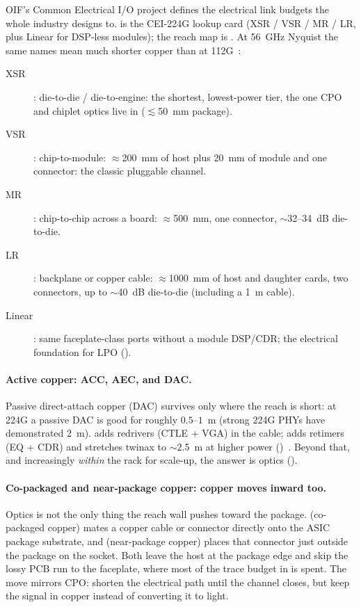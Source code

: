  OIF's Common Electrical I/O
project defines the electrical link budgets the whole industry designs to.
 is the CEI-224G lookup card (XSR / VSR / MR / LR, plus
Linear for DSP-less modules); the reach map is . At
56~GHz Nyquist the same names mean much shorter copper than at 112G~\cite{cei224}:
\begin{description}
\item[XSR] : die-to-die / die-to-engine: the shortest, lowest-power tier, the one CPO
      and chiplet optics live in ($\lesssim$50~mm package).
\item[VSR] : chip-to-module: $\approx$200~mm of host plus 20~mm of module and one
      connector: the classic pluggable channel.
\item[MR] : chip-to-chip across a board: $\approx$500~mm, one connector,
      $\sim$32--34~dB die-to-die.
\item[LR] : backplane or copper cable: $\approx$1000~mm of host and daughter cards,
      two connectors, up to $\sim$40~dB die-to-die (including a 1~m cable).
\item[Linear] : same faceplate-class ports without a module
      DSP/CDR; the electrical foundation for LPO ().
\end{description}

\paragraph{Active copper: ACC, AEC, and DAC.}
\label{sec:active-cables}

Passive direct-attach copper (DAC) survives only where the reach is short: at 224G a
passive DAC is good for roughly $0.5$--$1$~m (strong 224G PHYs have demonstrated
2~m).  adds redrivers (CTLE + VGA) in the cable; 
adds retimers (EQ + CDR) and stretches twinax to $\sim$2.5~m at higher power
()~\cite{dac224}. Beyond that, and
increasingly \emph{within} the rack for scale-up, the answer is optics
().

\paragraph{Co-packaged and near-package copper: copper moves inward too.}
\label{sec:cpc-npc}
Optics is not the only thing the reach wall pushes toward the package. 
(co-packaged copper) mates a copper cable or connector directly onto the ASIC package
substrate, and  (near-package copper) places that connector just outside
the package on the socket. Both leave the host at the package edge and skip the lossy
PCB run to the faceplate, where most of the trace budget in  is
spent. The move mirrors CPO: shorten the electrical path until the channel closes,
but keep the signal in copper instead of converting it to light.

